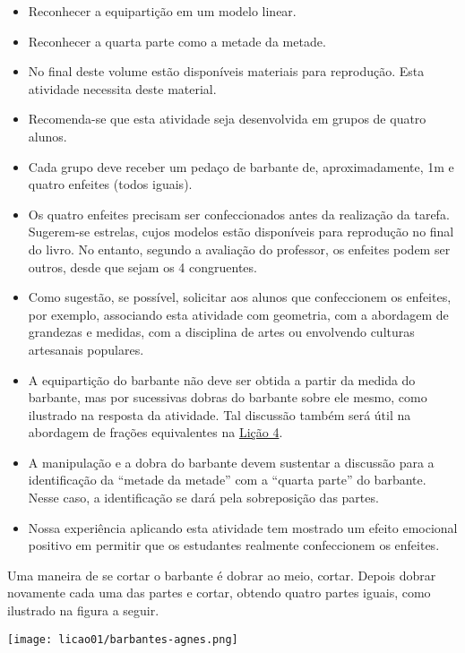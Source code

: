 \begin{atividade}\label{chap1-ativ3}
\objetivos
\begin{itemize} %
    \item       Reconhecer a equipartição em um modelo linear.
    \item       Reconhecer a quarta parte como a metade da metade.
\end{itemize} %


\discussoes
\begin{itemize} %
   \item No final deste volume estão disponíveis materiais para reprodução. Esta atividade necessita deste material.
   \item Recomenda-se que esta atividade seja desenvolvida em grupos de quatro alunos.
   \item       Cada grupo deve receber um pedaço de barbante de, aproximadamente, 1m e quatro enfeites (todos iguais).
    \item       Os quatro enfeites precisam ser confeccionados antes da realização da tarefa. Sugerem-se estrelas, cujos modelos estão disponíveis para reprodução no final do livro. No entanto, segundo a avaliação do professor, os enfeites podem ser outros, desde que sejam os 4 congruentes.
    \item       Como sugestão, se possível, solicitar aos alunos que confeccionem os enfeites, por exemplo, associando esta atividade com geometria, com a abordagem de grandezas e medidas, com a disciplina de artes ou envolvendo culturas artesanais populares.
    \item       A equipartição do barbante não deve ser obtida a partir da medida do barbante, mas por sucessivas dobras do barbante sobre ele mesmo, como ilustrado na resposta da atividade. Tal discussão também  será útil na abordagem de frações equivalentes na \hyperref[chap4]{Lição 4}.
    \item       A manipulação e a dobra do barbante devem sustentar a discussão para a identificação da       ``metade da metade'' com a       ``quarta parte'' do barbante. Nesse caso, a identificação se dará pela sobreposição das partes.
      \item Nossa experiência aplicando esta atividade tem mostrado um efeito emocional positivo em permitir que os estudantes realmente confeccionem os enfeites.
\end{itemize} %


\solucao
Uma maneira de se cortar o barbante é dobrar ao meio, cortar. Depois dobrar novamente cada uma das partes e cortar, obtendo quatro partes iguais, como ilustrado na figura a seguir.
\begin{center}
\texttt{[image: licao01/barbantes-agnes.png]}
\end{center}

\end{atividade}


